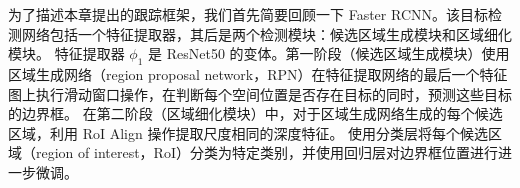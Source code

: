

为了描述本章提出的跟踪框架，我们首先简要回顾一下 Faster RCNN。该目标检测网络包括一个特征提取器，其后是两个检测模块：候选区域生成模块和区域细化模块。
特征提取器 $\phi_{1}$ 是 ResNet50 的变体。第一阶段（候选区域生成模块）使用区域生成网络（region proposal network，RPN）在特征提取网络的最后一个特征图上执行滑动窗口操作，在判断每个空间位置是否存在目标的同时，预测这些目标的边界框。
在第二阶段（区域细化模块）中，对于区域生成网络生成的每个候选区域，利用 RoI Align \cite{he2017mask} 操作提取尺度相同的深度特征。
使用分类层将每个候选区域（region of interest，RoI）分类为特定类别，并使用回归层对边界框位置进行进一步微调。

